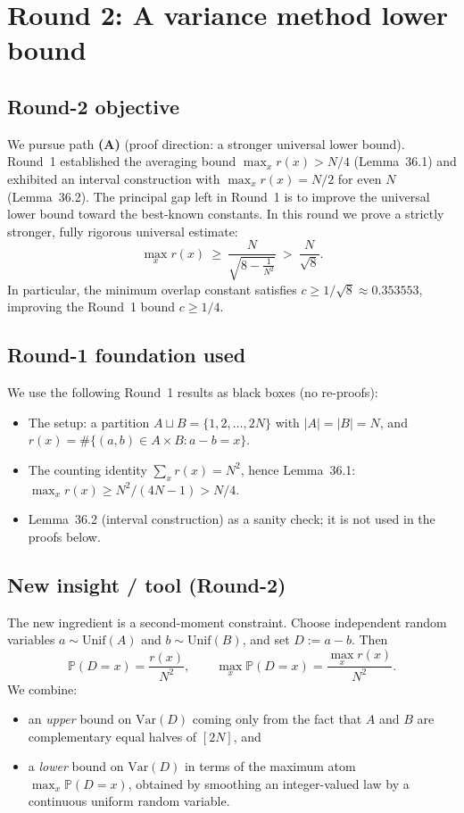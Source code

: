 \section{Round 2: A variance method lower bound}

\subsection{Round-2 objective}
We pursue path \textbf{(A)} (proof direction: a stronger universal lower bound).
Round~1 established the averaging bound
\(\max_x r(x)>N/4\) (Lemma~36.1) and exhibited an interval construction with
\(\max_x r(x)=N/2\) for even \(N\) (Lemma~36.2).
The principal gap left in Round~1 is to improve the universal lower bound toward the best-known constants.
In this round we prove a strictly stronger, fully rigorous universal estimate:
\[
\max_x r(x)\ \ge\ \frac{N}{\sqrt{8-\frac{1}{N^2}}}\ >\ \frac{N}{\sqrt 8}.
\]
In particular, the minimum overlap constant satisfies \(c\ge 1/\sqrt 8\approx 0.353553\), improving the Round~1 bound \(c\ge 1/4\).

\subsection{Round-1 foundation used}
We use the following Round~1 results as black boxes (no re-proofs):
\begin{itemize}
\item The setup: a partition \(A\sqcup B=\{1,2,\dots,2N\}\) with \(|A|=|B|=N\), and
\(r(x)=\#\{(a,b)\in A\times B: a-b=x\}\).
\item The counting identity \(\sum_x r(x)=N^2\), hence Lemma~36.1:
\(\max_x r(x)\ge N^2/(4N-1)>N/4\).
\item Lemma~36.2 (interval construction) as a sanity check; it is not used in the proofs below.
\end{itemize}

\subsection{New insight / tool (Round-2)}
The new ingredient is a second-moment constraint.
Choose independent random variables
\(a\sim \mathrm{Unif}(A)\) and \(b\sim \mathrm{Unif}(B)\), and set
\(D:=a-b\).
Then
\[
\mathbb P(D=x)=\frac{r(x)}{N^2},\qquad \max_x\mathbb P(D=x)=\frac{\max_x r(x)}{N^2}.
\]
We combine:
\begin{itemize}
\item an \emph{upper} bound on \(\mathrm{Var}(D)\) coming only from the fact that \(A\) and \(B\) are complementary equal halves of \([2N]\), and
\item a \emph{lower} bound on \(\mathrm{Var}(D)\) in terms of the maximum atom \(\max_x\mathbb P(D=x)\), obtained by smoothing an integer-valued law by a continuous uniform random variable.
\end{itemize}

